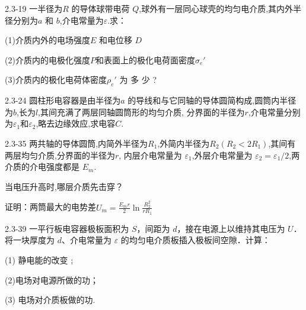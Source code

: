 \documentclass{article}
\begin{document}
\newpage

2.3-19 一半径为$R$ 的导体球带电荷 $Q$,球外有一层同心球壳的均匀电介质,其内外半径分别为$a$ 和 $b$,介电常量为$\varepsilon$.求：

(1)介质内外的电场强度$E$ 和电位移 $D$

(2)介质内的电极化强度$P$和表面上的极化电荷面密度$\sigma_e'$

(3)介质内的极化电荷体密度$\rho_e'$ 为 多 少 ? 















\newpage

2.3-24 圆柱形电容器是由半径为$a$ 的导线和与它同轴的导体圆简构成,圆筒内半径为$b$,长为$l$,其间充满了两层同轴圆筒形的均匀介质,
分界面的半径为$r$,介电常量分别为$\varepsilon_1$和$\varepsilon_2$,略去边缘效应,求电容$C.$













\newpage

2.3-35 两共轴的导体圆筒,内简外半径为$R_1$,外简内半径为$R_2(R_2<2R_1)$,其间有两层均匀介质,分界面的半径为$r$,
内层介电常量为 $\varepsilon _1$,外层介电常量为 $\varepsilon_2=\varepsilon_1/2$,两介质的介电强度都是 $E_m.$ 

当电压升高时,哪层介质先击穿？

证明：两筒最大的电势差$U_m=\frac{E_m r}{2}\ln\frac{R_{2}^{2}}{rR_{1}}$










\newpage

2.3-39 一平行板电容器极板面积为 $S$，间距为 $d$，接在电源上以维持其电压为 $U$．将一块厚度为 $d$、介电常量为 $\varepsilon$ 的均匀电介质板插入极板间空隙．计算：

(1) 静电能的改变 ; 

(2)电场对电源所做的功；

(3) 电场对介质板做的功.
\end{document}

